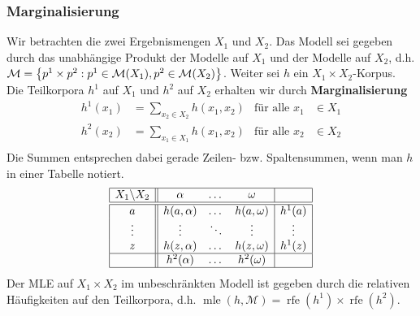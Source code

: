 \documentclass{beamer}
\DeclareMathOperator{\rfe}{rfe}
\begin{document}
\begin{frame} \frametitle{Marginalisierung}
	\justifying \footnotesize
	Wir betrachten die zwei Ergebnismengen $X_1$ und $X_2$. Das Modell sei gegeben durch das unabhängige Produkt der Modelle auf $X_1$ und der Modelle auf $X_2$, d.h. $\mathcal{M} = \left\{  p^1 \times p^2 : p^1 \in \mathcal{M}(X_1), p^2 \in \mathcal{M}(X_2) \right\}$. Weiter sei $h$ ein $X_1 \times X_2$-Korpus. Die Teilkorpora $h^1$ auf $X_1$ und $h^2$ auf $X_2$ erhalten wir durch \textbf{Marginalisierung}
	\begin{equation*}
		\begin{aligned}
			h^1(x_1) &= \sum_{x_2 \in X_2} h(x_1, x_2) & \text{für alle } x_1 &\in X_1 \\
			h^2(x_2) &= \sum_{x_1 \in X_1} h(x_1, x_2) & \text{für alle } x_2 &\in X_2 \\
		\end{aligned}
	\end{equation*}
	Die Summen entsprechen dabei gerade Zeilen- bzw. Spaltensummen, wenn man $h$ in einer Tabelle notiert.
	\begin{equation*}
		\begin{array}{|c||ccc|c|}
		\hline
			X_1 \backslash X_2 & \alpha & \dots & \omega & \\ \hline \hline
			a & h(a,\alpha) & \dots & h(a,\omega) & h^1(a) \\
			\vdots &\vdots & \ddots & \vdots & \vdots \\
			z & h(z,\alpha) & \dots & h(z,\omega) & h^1(z) \\ \hline
			& h^2(\alpha) & \dots & h^2(\omega) & \\ \hline
		\end{array}
	\end{equation*}
	Der MLE auf $X_1 \times X_2$ im unbeschränkten Modell ist gegeben durch die relativen Häufigkeiten auf den Teilkorpora, d.h. $\operatorname{mle}(h, \mathcal{M}) = \rfe(h^1) \times \rfe(h^2)$.	
\end{frame}
\end{document}
